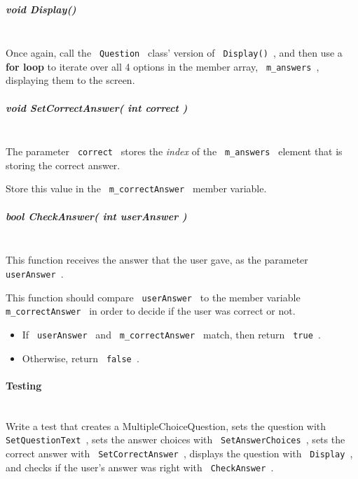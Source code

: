 \documentclass[a4paper,12pt]{book}
\begin{document}
                        \subparagraph{ void Display() } ~\\
                            Once again, call the \texttt{ Question } class' version of
                            \texttt{ Display() }, and then use a \textbf{ for loop }
                            to iterate over all 4 options in the member array,
                            \texttt{ m\_answers }, displaying them to the screen.
                        
                        \subparagraph{ void SetCorrectAnswer( int correct ) } ~\\
                            The parameter \texttt{ correct } stores the \textit{ index }
                            of the \texttt{ m\_answers } element that is storing
                            the correct answer.

                            Store this value in the \texttt{ m\_correctAnswer } member variable.

                        \newpage
                        \subparagraph{ bool CheckAnswer( int userAnswer ) } ~\\

                            This function receives the answer that the user gave,
                            as the parameter \texttt{ userAnswer }.

                            This function should compare \texttt{ userAnswer } to
                            the member variable \texttt{ m\_correctAnswer } in order
                            to decide if the user was correct or not.

                            \begin{itemize}
                                \item If \texttt{ userAnswer } and \texttt{ m\_correctAnswer } match, then return \texttt{ true }.
                                \item Otherwise, return \texttt{ false }.
                            \end{itemize}
                        
                    \paragraph{ Testing } ~\\
                        Write a test that creates a MultipleChoiceQuestion,
                        sets the question with \texttt{ SetQuestionText },
                        sets the answer choices with \texttt{ SetAnswerChoices },
                        sets the correct answer with \texttt{ SetCorrectAnswer },
                        displays the question with \texttt{ Display },
                        and checks if the user's answer was right with \texttt{ CheckAnswer }. \\
\end{document}

